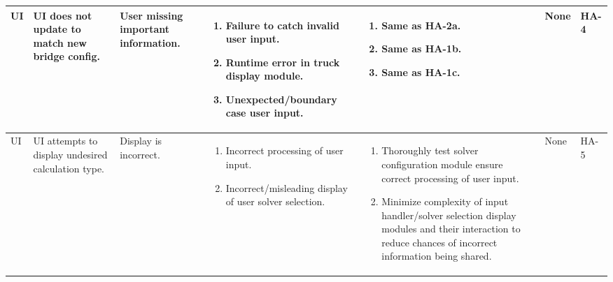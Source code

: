 \documentclass{article}
\begin{document}
\begin{landscape}
\begin{longtable}{|p{} | p{} | p{} | p{} | p{} | p{} | p{}|}
  UI & UI does not update to match new bridge config. & User missing important information. &
  \begin{enumerate}[leftmargin=*, label={\alph*.}, itemsep=1pt, topsep=0pt, partopsep=0pt] 
    \item Failure to catch invalid user input.
    \item Runtime error in truck display module.
    \item Unexpected/boundary case user input.
  \end{enumerate} &
  \begin{enumerate}[leftmargin=*, label={\alph*.}, itemsep=1pt, topsep=0pt, partopsep=0pt] 
    \item Same as HA-2a.
    \item  Same as HA-1b.
    \item Same as HA-1c.
  \end{enumerate} &
  None & HA-4 \\

  \hline

  UI & UI attempts to display undesired calculation type. & Display is incorrect. & 
  \begin{enumerate}[leftmargin=*, label={\alph*.}, itemsep=1pt, topsep=0pt, partopsep=0pt] 
    \item Incorrect processing of user input.
    \item Incorrect/misleading display of user solver selection.
  \end{enumerate} &
  \begin{enumerate}[leftmargin=*, label={\alph*.}, itemsep=1pt, topsep=0pt, partopsep=0pt] 
    \item Thoroughly test solver configuration module ensure correct processing of user input.
    \item Minimize complexity of input handler/solver selection display modules and their interaction to 
    reduce chances of incorrect information being shared.
  \end{enumerate} &
  None & HA-5 \\

  \hline


\end{longtable}
\end{landscape}
\end{document}
